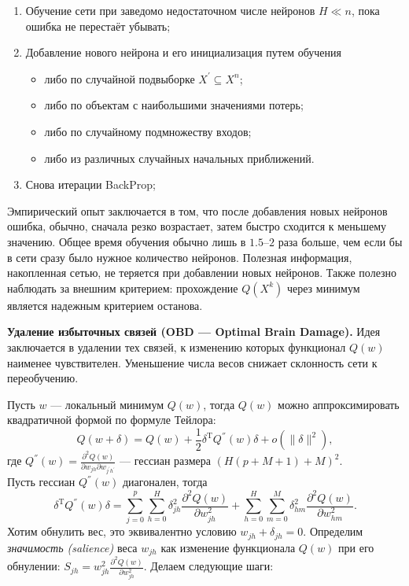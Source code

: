 \documentclass[specialist, 12pt, 
subf, %
href, colorlinks=true,
substylefile = spbu.rtx,
]{disser}
\begin{document}
\begin{enumerate}
	\item Обучение сети при заведомо недостаточном числе нейронов $H \ll n$, пока ошибка не перестаёт убывать;
	\item Добавление нового нейрона и его инициализация путем обучения 
	\begin{itemize}
		\item либо по случайной подвыборке $X^{'} \subseteq X^n$;
		\item либо по объектам с наибольшими значениями потерь;
		\item либо по случайному подмножеству входов;
		\item либо из различных случайных начальных приближений.
	\end{itemize}
	\item Снова итерации BackProp;
\end{enumerate}


Эмпирический опыт заключается в том, что после добавления новых нейронов ошибка, обычно, сначала резко возрастает, затем быстро сходится к меньшему значению. Общее время обучения обычно лишь в $1.5$--$2$ раза больше, чем если бы в сети сразу было нужное количество нейронов. Полезная информация, накопленная сетью, не теряется при добавлении новых нейронов. Также полезно наблюдать за внешним критерием: прохождение $Q(X^k)$ через минимум является надежным критерием останова.


\textbf{Удаление избыточных связей (OBD --- Optimal Brain Damage).} Идея заключается в удалении тех связей, к изменению которых функционал $Q(w)$ наименее чувствителен. Уменьшение числа весов снижает склонность сети к переобучению.

Пусть $w$ --- локальный минимум $Q(w)$, тогда $Q(w)$ можно аппроксимировать квадратичной формой по формуле Тейлора:
\begin{equation*}
Q(w + \delta) = Q(w) + \frac{1}{2} \delta^{\mathrm{T}} Q^{''}(w) \delta + o(\| \delta\|^2),
\end{equation*}
где $Q^{''}(w) =  \frac{\partial^2 Q(w) }{\partial w_{jh} \partial w_{j^{'}h^{'}}}$ --- гессиан размера $(H(p+M+1) + M)^2$.\\

Пусть гессиан $Q^{''}(w)$ диагонален, тогда
\begin{equation*}
\delta^{\mathrm{T}} Q^{''}(w) \delta = \sum_{j=0}^{p}\sum_{h=0}^{H} \delta^2_{jh}   \frac{\partial^2 Q(w) }{\partial w_{jh}^2 }  +  \sum_{h=0}^{H}\sum_{m=0}^{M} \delta^2_{hm}   \frac{\partial^2 Q(w) }{\partial w_{hm}^2 }.
\end{equation*}
Хотим обнулить вес, это эквивалентно условию $w_{jh} + \delta_{jh}=0$. Определим \textit{значимость (salience)} веса $w_{jh}$ как изменение функционала $Q(w)$ при его обнулении: $S_{jh} = w^2_{jh}  \frac{\partial^2 Q(w) }{\partial w_{jh}^2 } $. Делаем следующие шаги:
\end{document}
